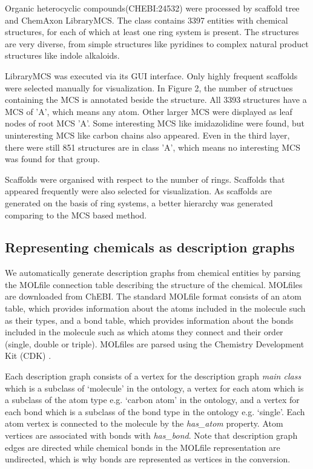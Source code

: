 \documentclass[10pt]{bmc_article}
\newenvironment{bmcformat}{\baselineskip20pt\sloppy\setboolean{publ}{false}}{\baselineskip20pt\sloppy}
\begin{document}
\begin{bmcformat}
Organic heterocyclic compounds(CHEBI:24532) were processed by scaffold tree and ChemAxon LibraryMCS. The class contains 3397 entities with chemical structures, for each of which at least one ring system is present. The structures are very diverse, from simple structures like pyridines to complex natural product structures like indole alkaloids. 

LibraryMCS was executed via its GUI interface. Only highly frequent scaffolds were selected manually for visualization. In Figure 2, the number of structues containing the MCS is annotated beside the structure. All 3393 structures have a MCS of 'A', which means any atom. Other larger MCS were displayed as leaf nodes of root MCS 'A'. Some interesting MCS like imidazolidine were found, but uninteresting MCS like carbon chains also appeared. Even in the third layer, there were still 851 structures are in class 'A', which means no interesting MCS was found for that group.

Scaffolds were organised with respect to the number of rings. Scaffolds that appeared frequently were also selected for visualization. As scaffolds are generated on the basis of ring systems, a better hierarchy was generated comparing to the MCS based method.


\subsection*{Representing chemicals as description graphs}

We automatically generate description graphs from chemical entities by parsing the MOLfile connection table describing the structure of the chemical. MOLfiles are downloaded from ChEBI. The standard MOLfile format consists of an atom table, which provides information about the atoms included in the molecule such as their types, and a bond table, which provides information about the bonds included in the molecule such as which atoms they connect and their order (single, double or triple). MOLfiles are parsed using the Chemistry Development Kit (CDK) \cite{cdk2006}.

Each description graph consists of a vertex for the description graph \textit{main class} which is a subclass of `molecule' in the ontology, a vertex for each atom which is a subclass of the atom type e.g. `carbon atom' in the ontology, and a vertex for each bond which is a subclass of the bond type in the ontology e.g. `single'. Each atom vertex is connected to the molecule by the \textit{has\_atom} property. Atom vertices are associated with bonds with \textit{has\_bond}. Note that description graph edges are directed while chemical bonds in the MOLfile representation are undirected, which is why bonds are represented as vertices in the conversion. 


\end{bmcformat}
\end{document}
